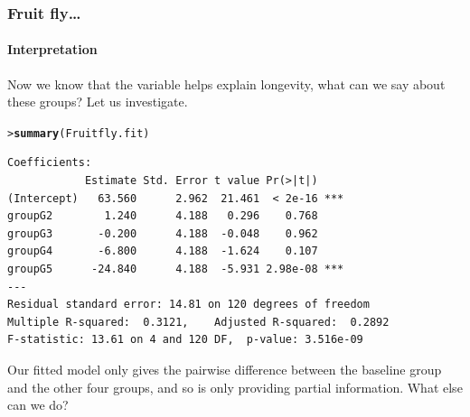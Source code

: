 \documentclass{beamer}\usepackage[]{graphicx}\usepackage[]{xcolor}
\makeatletter
\newcommand{\hlstd}[1]{\textcolor[rgb]{0.345,0.345,0.345}{#1}}%
\newcommand{\hlkwd}[1]{\textcolor[rgb]{0.737,0.353,0.396}{\textbf{#1}}}%
\newenvironment{kframe}{%
 \def\at@end@of@kframe{}%
 \ifinner\ifhmode%
  \def\at@end@of@kframe{\end{minipage}}%
  \begin{minipage}{\columnwidth}%
 \fi\fi%
 \def\FrameCommand##1{\hskip\@totalleftmargin \hskip-\fboxsep
 \colorbox{shadecolor}{##1}\hskip-\fboxsep
     \hskip-\linewidth \hskip-\@totalleftmargin \hskip\columnwidth}%
 \MakeFramed {\advance\hsize-\width
   \@totalleftmargin\z@ \linewidth\hsize
   \@setminipage}}%
 {\par\unskip\endMakeFramed%
 \at@end@of@kframe}
\newenvironment{knitrout}{}{} %
\makeatother
\begin{document}
\begin{frame}[fragile,label=refcell_coeffs]
\frametitle{Fruit fly\ldots}
\framesubtitle{Interpretation}
Now we know that the variable  helps explain longevity,
what can we say about these groups? Let us investigate.

\begin{knitrout}\scriptsize
{}\color{fgcolor}\begin{kframe}
\begin{alltt}
\hlstd{> }\hlkwd{summary}\hlstd{(Fruitfly.fit)}
\end{alltt}
\end{kframe}
\end{knitrout}

\begin{knitrout}\scriptsize
{}\color{fgcolor}\begin{kframe}
\begin{verbatim}
Coefficients:
            Estimate Std. Error t value Pr(>|t|)    
(Intercept)   63.560      2.962  21.461  < 2e-16 ***
groupG2        1.240      4.188   0.296    0.768    
groupG3       -0.200      4.188  -0.048    0.962    
groupG4       -6.800      4.188  -1.624    0.107    
groupG5      -24.840      4.188  -5.931 2.98e-08 ***
---
Residual standard error: 14.81 on 120 degrees of freedom
Multiple R-squared:  0.3121,	Adjusted R-squared:  0.2892 
F-statistic: 13.61 on 4 and 120 DF,  p-value: 3.516e-09
\end{verbatim}
\end{kframe}
\end{knitrout}

Our fitted model only gives the pairwise difference between the baseline group  and the other four groups, and so is only providing partial information. What else can we do?
\end{frame}
\end{document}
